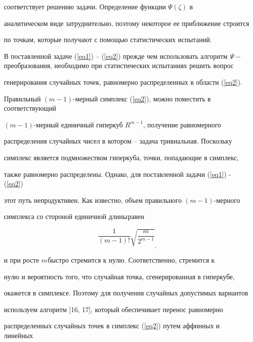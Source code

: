 \documentclass [12pt]{article}
\begin{document}
соответствует решению задачи. Определение функции $\Psi (\zeta )$ в 

аналитическом виде затруднительно, поэтому некоторое ее приближение строится 

по точкам, которые получают с помощью статистических испытаний. 



В поставленной задаче (\ref{eq1}) -- (\ref{eq2}) прежде чем использовать алгоритм $\Psi - 

$преобразования, необходимо при статистических испытаниях решить вопрос 

генерирования случайных точек, равномерно распределенных в области (\ref{eq2}). 



Правильный $(m - 1)$-мерный симплекс (\ref{eq2}), можно поместить в соответствующий 

$(m - 1)$-мерный единичный гиперкуб $R^{m - 1}$, получение равномерного 

распределения случайных чисел в котором -- задача тривиальная. Поскольку 

симплекс является подмножеством гиперкуба, точки, попадающие в симплекс, 

также равномерно распределены. Однако, для поставленной задачи (\ref{eq1}) - (\ref{eq2}) 

этот путь непродуктивен. Как известно, объем правильного $(m - 1)$-мерного 

симплекса со стороной единичной длины$_{ }$равен





\[

\frac{1}{(m - 1)!}\sqrt {\frac{m}{2^{m - 1}}} _{,}

\]







\noindent

и при росте $m_{ }$быстро стремится к нулю. Соответственно, стремится к 

нулю и вероятность того, что случайная точка, сгенерированная в гиперкубе, 

окажется в симплексе. Поэтому для получения случайных допустимых вариантов 

используем алгоритм [16, 17], который обеспечивает перенос равномерно 

распределенных случайных точек в симплекс (\ref{eq2}) путем аффинных и линейных 
\end{document}
